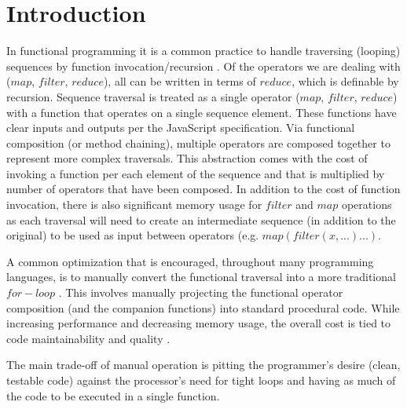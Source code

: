 \chapter{Introduction}
In functional programming it is a common practice to handle traversing (looping) sequences by function invocation/recursion \cite{recurse16}.  Of the operators we are dealing with ($map$, $filter$, $reduce$), all can be written in terms of $reduce$, which is definable by recursion. Sequence traversal is treated as a single operator ($map$, $filter$, $reduce$) with a function that operates on a single sequence element. These functions have clear inputs and outputs per the JavaScript specification.  Via functional composition (or method chaining), multiple operators are composed together to represent more complex traversals.  This abstraction comes with the cost of invoking a function per each element of the sequence and that is multiplied by number of operators that have been composed. In addition to the cost of function invocation, there is also significant memory usage for $filter$ and $map$ operations as each traversal will need to create an intermediate sequence (in addition to the original) to be used as input between operators (e.g. $map(filter(x, ...)...)$.  

A common optimization that is encouraged, throughout many programming languages, is to manually convert the functional traversal into a more traditional $for-loop$ \cite{iterperf09} \cite{iterperf10} \cite{iterperf11}.  This involves manually projecting the functional operator composition (and the companion functions) into standard procedural code.  While increasing performance and decreasing memory usage, the overall cost is tied to code maintainability and quality \cite{TODO}.  

The main trade-off of manual operation is pitting the programmer's desire (clean, testable code) against the processor's need for tight loops and having as much of the code to be executed in a single function.  